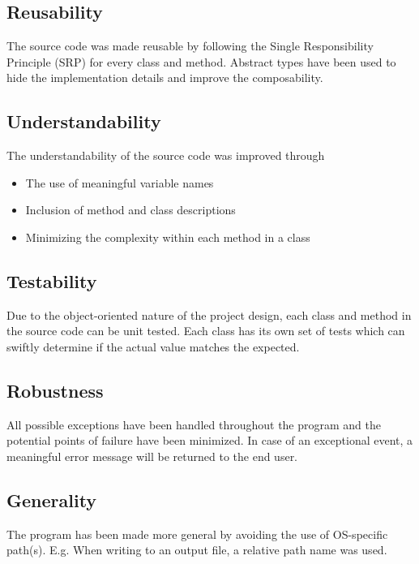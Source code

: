   \subsection{Reusability}
    \begin{flushleft}
      The source code was made reusable by following the Single Responsibility Principle (SRP) for every class and method. Abstract types have been used to hide the implementation details and improve the composability.
    \end{flushleft}

  \subsection{Understandability}
    \begin{flushleft}
      The understandability of the source code was improved through
      \begin{itemize}
        \item {The use of meaningful variable names}
        \item {Inclusion of method and class descriptions}
        \item {Minimizing the complexity within each method in a class}
      \end{itemize}
    \end{flushleft}

  \subsection{Testability}
    \begin{flushleft}
      Due to the object-oriented nature of the project design, each class and method in the source code can be unit tested. Each class has its own set of tests which can swiftly determine if the actual value matches the expected.
    \end{flushleft}

  \subsection{Robustness}
  \begin{flushleft}
    All possible exceptions have been handled throughout the program and the potential points of failure have been minimized. In case of an exceptional event, a meaningful error message will be returned to the end user.
  \end{flushleft}

  \subsection{Generality}
    \begin{flushleft}
      The program has been made more general by avoiding the use of OS-specific path(s). E.g. When writing to an output file, a relative path name was used.
    \end{flushleft}

